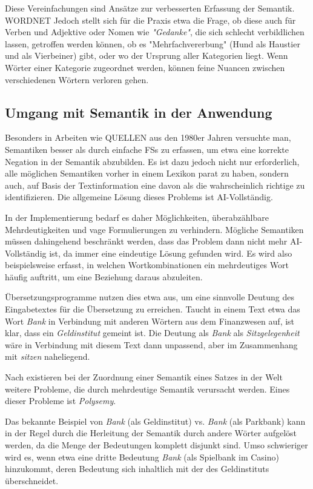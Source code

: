 \documentclass[12pt]{report}
\begin{document}
Diese Vereinfachungen sind Ansätze zur verbesserten Erfassung der Semantik. WORDNET Jedoch stellt sich für die Praxis etwa die Frage, ob diese auch für Verben und Adjektive oder Nomen wie \textit{"Gedanke"}, die sich schlecht verbildlichen lassen, getroffen werden können, ob es "Mehrfachvererbung" (Hund als Haustier und als Vierbeiner) gibt, oder wo der Ursprung aller Kategorien liegt. Wenn Wörter einer Kategorie zugeordnet werden, können feine Nuancen zwischen verschiedenen Wörtern verloren gehen.

\subsection{Umgang mit Semantik in der Anwendung}
Besonders in Arbeiten wie QUELLEN aus den 1980er Jahren versuchte man, Semantiken besser als durch einfache FSs zu erfassen, um etwa eine korrekte Negation in der Semantik abzubilden. Es ist dazu jedoch nicht nur erforderlich, alle möglichen Semantiken vorher in einem Lexikon parat zu haben, sondern auch, auf Basis der Textinformation eine davon als die wahrscheinlich richtige zu identifizieren. Die allgemeine Lösung dieses Problems ist AI-Vollständig. 

In der Implementierung bedarf es daher Möglichkeiten, überabzählbare Mehrdeutigkeiten und vage Formulierungen zu verhindern. Mögliche Semantiken müssen dahingehend beschränkt werden, dass das Problem dann nicht mehr AI-Vollständig ist, da immer eine eindeutige Lösung gefunden wird. Es wird also beispielsweise erfasst, in welchen Wortkombinationen ein mehrdeutiges Wort häufig auftritt, um eine Beziehung daraus abzuleiten. 

Übersetzungsprogramme nutzen dies etwa aus, um eine sinnvolle Deutung des Eingabetextes für die Übersetzung zu erreichen. Taucht in einem Text etwa das Wort \textit{Bank} in Verbindung mit anderen Wörtern aus dem Finanzwesen auf, ist klar, dass ein \textit{Geldinstitut} gemeint ist. Die Deutung als \textit{Bank} als \textit{Sitzgelegenheit} wäre in Verbindung mit diesem Text dann unpassend, aber im Zusammenhang mit \textit{sitzen} naheliegend. 

Nach \cite{car52} existieren bei der Zuordnung einer Semantik eines Satzes in der Welt weitere Probleme, die durch mehrdeutige Semantik verursacht werden. Eines dieser Probleme ist \textit{Polysemy}. 

Das bekannte Beispiel von \textit{Bank} (als Geldinstitut) vs. \textit{Bank} (als Parkbank) kann in der Regel durch die Herleitung der Semantik durch andere Wörter aufgelöst werden, da die Menge der Bedeutungen komplett disjunkt sind. Umso schwieriger wird es, wenn etwa eine dritte Bedeutung \textit{Bank} (als Spielbank im Casino) hinzukommt, deren Bedeutung sich inhaltlich mit der des Geldinstituts überschneidet. 
\end{document}
